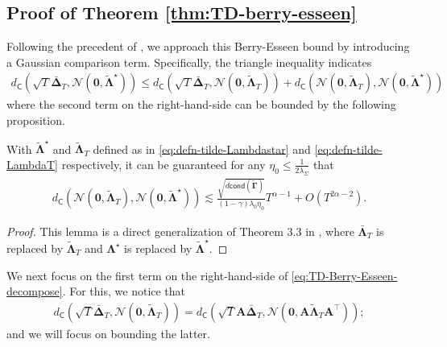 \subsection{Proof of Theorem \ref{thm:TD-berry-esseen}} \label{app:proof-TD-Berry-Esseen}
Following the precedent of \cite{wu2024statistical}, we approach this Berry-Esseen bound by introducing a Gaussian comparison term. Specifically, the triangle inequality indicates
\begin{align}\label{eq:TD-Berry-Esseen-decompose}
d_{\mathsf{C}}(\sqrt{T} \bar{\bm{\Delta}}_T,\mathcal{N}(\bm{0},\widetilde{\bm{\Lambda}}^{\star}))\leq d_{\mathsf{C}}(\sqrt{T} \bar{\bm{\Delta}}_T,\mathcal{N}(\bm{0},\widetilde{\bm{\Lambda}}_T)) + d_{\mathsf{C}}(\mathcal{N}(\bm{0},\widetilde{\bm{\Lambda}}_T), \mathcal{N}(\bm{0},\widetilde{\bm{\Lambda}}^{\star}))
\end{align}
where the second term on the right-hand-side can be bounded by the following proposition.
\begin{customlemma}\label{lemma:Gaussian-comparison}
With $\tilde{\bm{\Lambda}}^\star$ and $\tilde{\bm{\Lambda}}_T$ defined as in \eqref{eq:defn-tilde-Lambdastar} and \eqref{eq:defn-tilde-LambdaT} respectively, it can be guaranteed for any $\eta_0 \leq \frac{1}{2\lambda_{\Sigma}}$ that
\begin{align*}
d_{\mathsf{C}}(\mathcal{N}(\bm{0},\widetilde{\bm{\Lambda}}_T), \mathcal{N}(\bm{0},\widetilde{\bm{\Lambda}}^{\star})) \lesssim \frac{\sqrt{d\mathsf{cond}(\bm{\tilde{\Gamma}})}}{(1-\gamma)\lambda_0\eta_0} T^{\alpha-1} + O(T^{2\alpha-2}).
\end{align*}
\end{customlemma}
\begin{proof}
This lemma is a direct generalization of Theorem 3.3 in \cite{wu2024statistical}, where $\bar{\bm{\Lambda}}_T$ is replaced by $\tilde{\bm{\Lambda}}_T$ and $\bm{\Lambda}^\star$ is replaced by $\tilde{\bm{\Lambda}}^\star$. 
\end{proof}

We next focus on the first term on the right-hand-side of \eqref{eq:TD-Berry-Esseen-decompose}. For this, we notice that 
\begin{align*}
d_{\mathsf{C}}(\sqrt{T} \bar{\bm{\Delta}}_T,\mathcal{N}(\bm{0},\widetilde{\bm{\Lambda}}_T)) = d_{\mathsf{C}}(\sqrt{T} \bm{A}\bar{\bm{\Delta}}_T,\mathcal{N}(\bm{0},\bm{A}\widetilde{\bm{\Lambda}}_T\bm{A}^\top));
\end{align*}
and we will focus on bounding the latter.

